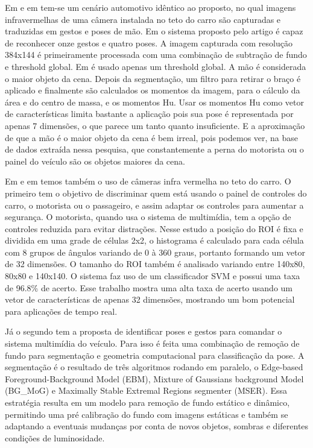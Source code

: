 Em \cite{zobl2004gesture} e em \cite{akyol2000gesture} tem-se um cenário automotivo idêntico ao proposto, no qual imagens infravermelhas de uma câmera instalada no teto do carro são capturadas e traduzidas em gestos e poses de mão. Em \cite{zobl2004gesture} o sistema proposto pelo artigo é capaz de reconhecer onze gestos e quatro poses. A imagem capturada com resolução 384x144 é primeiramente processada com uma combinação de subtração de fundo e threshold global. Em \cite{akyol2000gesture} é usado apenas um threshold global. A mão é considerada o maior objeto da cena. Depois da segmentação, um filtro para retirar o braço é aplicado e finalmente são calculados os momentos da imagem, para o cálculo da área e do centro de massa, e os momentos Hu. Usar os momentos Hu como vetor de características limita bastante a aplicação pois sua pose é representada por apenas 7 dimensões, o que parece um tanto quanto insuficiente. E a aproximação de que a mão é o maior objeto da cena é bem irreal, pois podemos ver, na base de dados extraída nessa pesquisa, que constantemente a perna do motorista ou o painel do veículo são os objetos maiores da cena.

Em \cite{cheng2008real} e em \cite{parada2014hand} temos também o uso de câmeras infra vermelha no teto do carro. O primeiro tem o objetivo de discriminar quem está usando o painel de controles do carro, o motorista ou o passageiro, e assim adaptar os controles para aumentar a segurança. O motorista, quando usa o sistema de multimídia, tem a opção de controles reduzida para evitar distrações. Nesse estudo a posição do ROI é fixa e dividida em uma grade de células 2x2, o histograma é calculado para cada célula com 8 grupos de ângulos variando de 0 à 360 graus, portanto formando um vetor de 32 dimensões. O tamanho do ROI também é analisado variando entre 140x80, 80x80 e 140x140. O sistema faz uso de um classificador SVM e possui uma taxa de 96.8\% de acerto. Esse trabalho mostra uma alta taxa de acerto usando um vetor de características de apenas 32 dimensões, mostrando um bom potencial para aplicações de tempo real.

Já o segundo tem a proposta de identificar poses e gestos para comandar o sistema multimídia do veículo. Para isso é feita uma combinação de remoção de fundo para segmentação e geometria computacional para classificação da pose. A segmentação é o resultado de três algoritmos rodando em paralelo, o Edge-based Foreground-Background Model (EBM), Mixture of Gaussians background Model (BG\_MoG) e Maximally Stable Extremal Regions segmenter (MSER). Essa estratégia resulta em um modelo para remoção de fundo estático e dinâmico, permitindo uma pré calibração do fundo com imagens estáticas e também se adaptando a eventuais mudanças por conta de novos objetos, sombras e diferentes condições de luminosidade.